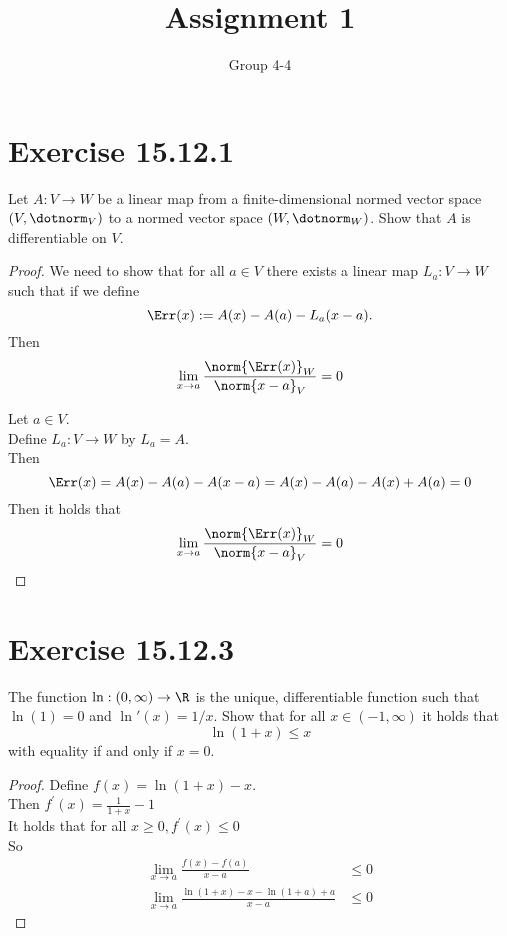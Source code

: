 \documentclass{assignment}
\author{Group 4-4}
\title{Assignment 1}
\begin{document}
\section{Exercise 15.12.1}
\begin{problem}
    Let $A: V \to W$ be a linear map from a finite-dimensional normed vector space $(V,\dotnorm_V)$ to
    a normed vector space $(W,\dotnorm_W)$. Show that $A$ is differentiable on $V$.
\end{problem}
\begin{proof}
    We need to show that for all $a \in V$ there exists a linear map $L_a:V\to W$ such that if we define
    $$\Err(x) := A(x)-A(a)-L_a(x-a).$$
    Then
    $$\lim_{x \to a} \frac{\norm{\Err(x)}_W}{\norm{x-a}_V} = 0$$

    \noindent Let $a \in V$. \\
    Define $L_a:V \to W$ by $L_a = A$. \\
    Then 
    $$\Err(x) = A(x)-A(a)-A(x-a)= A(x)-A(a)-A(x)+A(a) = 0$$
    Then it holds that 
    $$\lim_{x \to a} \frac{\norm{\Err(x)}_W}{\norm{x-a}_V} = 0$$

\end{proof}

\section{Exercise 15.12.3}
\begin{problem}
    The function $\ln:(0,\infty) \to \R$ is the unique, differentiable function such that $\ln(1)=0$ and
    $\ln'(x) = 1/x$. Show that for all $x \in (-1,\infty)$ it holds that
    $$\ln(1+x) \le x$$
    with equality if and only if $x=0$.
\end{problem}
\begin{proof}
    Define $f(x) = \ln(1+x) - x$. \\
    Then $f^\prime(x) = \frac{1}{1+x} - 1$ \\
    It holds that for all $x \ge 0, f^\prime(x) \le 0$ \\
    So 
    \begin{align*}
        \lim_{x\to a} \frac{f(x)-f(a)}{x-a} &\le 0 \\
        \lim_{x\to a} \frac{\ln(1+x)-x - \ln(1+a)+a}{x-a} &\le 0
    \end{align*}

\end{proof}
\end{document}
